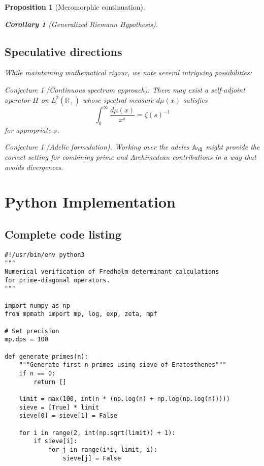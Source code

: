 \documentclass[11pt,a4paper]{article}
\newtheorem{proposition}[theorem]{Proposition}
\newtheorem{corollary}[theorem]{Corollary}
\theoremstyle{definition}
\theoremstyle{remark}
\newtheorem{conjecture}[theorem]{Conjecture}
\newcommand{\R}{\mathbb{R}}
\begin{document}
\begin{proposition}[Meromorphic continuation]
\begin{corollary}[Generalized Riemann Hypothesis]
\subsection{Speculative directions}

While maintaining mathematical rigour, we note several intriguing possibilities:

\begin{conjecture}[Continuous spectrum approach]
There may exist a self-adjoint operator $H$ on $L^2(\R_+)$ whose spectral measure 
$d\mu(x)$ satisfies
\[
\int_0^\infty \frac{d\mu(x)}{x^s} = \zeta(s)^{-1}
\]
for appropriate $s$.
\end{conjecture}

\begin{conjecture}[Adelic formulation]
Working over the adeles $\mathbb{A}_\Q$ might provide the correct setting for 
combining prime and Archimedean contributions in a way that avoids divergences.
\end{conjecture}

\appendix

\section{Python Implementation}\label{app:code}

\subsection{Complete code listing}

\begin{lstlisting}
#!/usr/bin/env python3
"""
Numerical verification of Fredholm determinant calculations
for prime-diagonal operators.
"""

import numpy as np
from mpmath import mp, log, exp, zeta, mpf

# Set precision
mp.dps = 100

def generate_primes(n):
    """Generate first n primes using sieve of Eratosthenes"""
    if n == 0:
        return []
    
    limit = max(100, int(n * (np.log(n) + np.log(np.log(n)))))
    sieve = [True] * limit
    sieve[0] = sieve[1] = False
    
    for i in range(2, int(np.sqrt(limit)) + 1):
        if sieve[i]:
            for j in range(i*i, limit, i):
                sieve[j] = False
    

\end{lstlisting}
\end{corollary}
\end{proposition}
\end{document}

